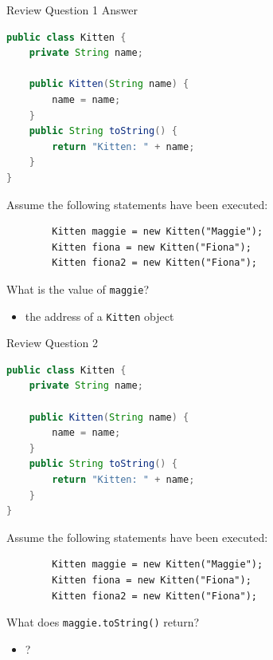 \documentclass{beamer}
\begin{document}
\begin{frame}[fragile]{Review Question 1 Answer}
\vspace{-.05in}
\begin{lstlisting}[language=Java]
public class Kitten {
    private String name;

    public Kitten(String name) {
        name = name;
    }
    public String toString() {
        return "Kitten: " + name;
    }
}
\end{lstlisting}
\vspace{-.05in}
Assume the following statements have been executed:
\vspace{-.05in}
\begin{lstlisting}
        Kitten maggie = new Kitten("Maggie");
        Kitten fiona = new Kitten("Fiona");
        Kitten fiona2 = new Kitten("Fiona");
\end{lstlisting}
\vspace{-.05in}
What is the value of {\tt maggie}?
\begin{itemize}
\itemsep0em
\item the address of a {\tt Kitten} object
\end{itemize}
\end{frame}

\begin{frame}[fragile]{Review Question 2}
\vspace{-.05in}
\begin{lstlisting}[language=Java]
public class Kitten {
    private String name;

    public Kitten(String name) {
        name = name;
    }
    public String toString() {
        return "Kitten: " + name;
    }
}
\end{lstlisting}
\vspace{-.05in}
Assume the following statements have been executed:
\vspace{-.05in}
\begin{lstlisting}
        Kitten maggie = new Kitten("Maggie");
        Kitten fiona = new Kitten("Fiona");
        Kitten fiona2 = new Kitten("Fiona");
\end{lstlisting}
\vspace{-.05in}
What does {\tt maggie.toString()} return?
\begin{itemize}
\itemsep0em
\item ?
\end{itemize}
\end{frame}
\end{document}
